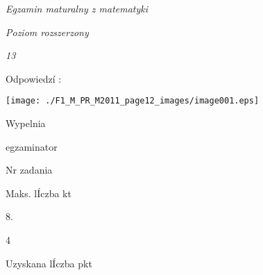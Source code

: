 \documentclass[a4paper,12pt]{article}
\begin{document}
{\it Egzamin maturalny z matematyki}

{\it Poziom rozszerzony}

{\it 13}

Odpowiedzí :
\begin{center}
\texttt{[image: ./F1\_M\_PR\_M2011\_page12\_images/image001.eps]}
\end{center}
Wypelnia

egzaminator

Nr zadania

Maks. lÍczba kt

8.

4

Uzyskana lÍczba pkt
\end{document}
